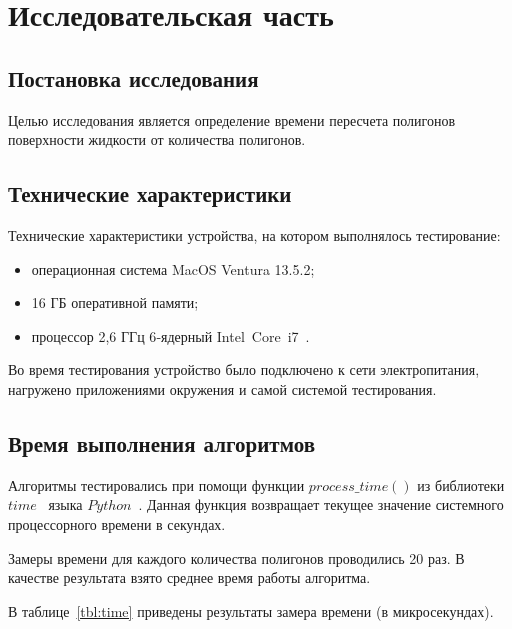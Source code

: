 \chapter{Исследовательская часть}

\section{Постановка исследования}

Целью исследования является определение времени пересчета полигонов поверхности жидкости от количества полигонов.


\section{Технические характеристики}

Технические характеристики устройства, на котором выполнялось тестирование:
\begin{itemize}[label={---}]
	\item операционная система MacOS Ventura 13.5.2;
	\item 16 ГБ оперативной памяти;
    \item процессор 2,6 ГГц 6‑ядерный Intel Core i7~\cite{intel}.

\end{itemize}

Во время тестирования устройство было подключено к сети электропитания, нагружено приложениями окружения и самой системой тестирования.

\section{Время выполнения алгоритмов}

Алгоритмы тестировались при помощи функции $process\_time()$ из библиотеки $time$~\cite{pythonlangtime} языка $Python$~\cite{python}. 
Данная функция возвращает текущее значение системного процессорного времени в секундах.

Замеры времени для каждого количества полигонов проводились 20 раз. 
В качестве результата взято среднее время работы алгоритма. 

В таблице~\ref{tbl:time} приведены результаты замера времени (в микросекундах). 


